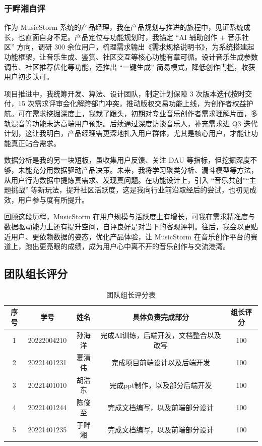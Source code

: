 \documentclass{base}
\numberwithin{figure}{section} %
\begin{document}
\newpage
\subsubsection{于畔湘自评}

作为 MusicStorm 系统的产品经理，我在产品规划与推进的旅程中，见证系统成长，也直面自身不足。产品定位与功能规划时，我锚定 “AI 辅助创作 + 音乐社区” 方向，调研 300 余位用户，梳理需求输出《需求规格说明书》，为系统搭建起功能框架，让音乐生成、鉴赏、社区交互等核心功能有章可循。设计音乐生成参数调节、社区推荐优化等功能，还推出 “一键生成” 简易模式，降低创作门槛，收获用户初步认可。

项目推进中，我统筹开发、算法、设计团队，制定计划保障 3 次版本迭代按时交付，15 次需求评审会化解跨部门冲突，推动版权交易功能上线，为创作者权益护航。可在需求挖掘深度上，我栽了跟头，初期对专业音乐创作者需求理解片面，多轨混音等功能未达高端用户预期。后续通过深度访谈音乐人，补充需求进 Q3 迭代计划，这让我明白，产品经理需更深地扎入用户群体，尤其是核心用户，才能让功能真正贴合需求。

数据分析是我的另一块短板，虽收集用户反馈、关注 DAU 等指标，但挖掘深度不够，未能充分用数据驱动产品决策。未来，我将学习聚类分析、漏斗模型等方法，从用户行为数据中提炼真需求、发现真问题。在功能设计上，引入 “音乐共创”“主题挑战” 等新玩法，提升社区活跃度，这是我向行业前沿取经后的尝试，也初见成效，用户参与度有所提升。

回顾这段历程，MusicStorm 在用户规模与活跃度上有增长，可我在需求精准度与数据驱动能力上还有提升空间，自评良好是对当下的客观评判。往后，我会以更贴近用户、更依赖数据的姿态，优化产品体验，让 MusicStorm 在音乐创作平台的赛道上，跑出更亮眼的成绩，成为用户心中离不开的音乐创作与交流港湾。

\newpage
\subsection{团队组长评分}

\begin{longtable}{@{}ccccc@{}}
\caption{团队组长评分表}
\label{tab:my-table}\\
\toprule
\textbf{序号} & \textbf{学号}  & \textbf{姓名} & \textbf{具体负责完成部分}    & \textbf{组长评分} \\* \midrule
\endhead
%
\bottomrule
\endfoot
%
\endlastfoot
%
1           & 20222004210 & 孙海洋         & 完成AI训练，后端开发，文档整合以及改写 & 100           \\
2           & 20221401231  & 夏清伟         & 完成项目前端设计以及后端开发       & 100           \\
3           & 20221401010  & 胡浩东         & 完成ppt制作，以及部分后端开发     & 100           \\
4           & 20221401244  & 陈俊至         & 完成文档编写，以及前端部分设计      & 100           \\
5           & 20221401235  & 于畔湘         & 完成文档编写，以及前端部分设计      & 100           \\* \bottomrule
\end{longtable}


\end{document}
